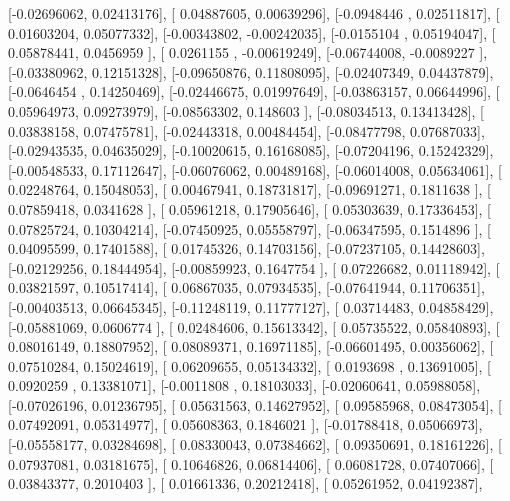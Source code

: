 \documentclass{article}
\begin{document}
       [-0.02696062,  0.02413176],
       [ 0.04887605,  0.00639296],
       [-0.0948446 ,  0.02511817],
       [ 0.01603204,  0.05077332],
       [-0.00343802, -0.00242035],
       [-0.0155104 ,  0.05194047],
       [ 0.05878441,  0.0456959 ],
       [ 0.0261155 , -0.00619249],
       [-0.06744008, -0.0089227 ],
       [-0.03380962,  0.12151328],
       [-0.09650876,  0.11808095],
       [-0.02407349,  0.04437879],
       [-0.0646454 ,  0.14250469],
       [-0.02446675,  0.01997649],
       [-0.03863157,  0.06644996],
       [ 0.05964973,  0.09273979],
       [-0.08563302,  0.148603  ],
       [-0.08034513,  0.13413428],
       [ 0.03838158,  0.07475781],
       [-0.02443318,  0.00484454],
       [-0.08477798,  0.07687033],
       [-0.02943535,  0.04635029],
       [-0.10020615,  0.16168085],
       [-0.07204196,  0.15242329],
       [-0.00548533,  0.17112647],
       [-0.06076062,  0.00489168],
       [-0.06014008,  0.05634061],
       [ 0.02248764,  0.15048053],
       [ 0.00467941,  0.18731817],
       [-0.09691271,  0.1811638 ],
       [ 0.07859418,  0.0341628 ],
       [ 0.05961218,  0.17905646],
       [ 0.05303639,  0.17336453],
       [ 0.07825724,  0.10304214],
       [-0.07450925,  0.05558797],
       [-0.06347595,  0.1514896 ],
       [ 0.04095599,  0.17401588],
       [ 0.01745326,  0.14703156],
       [-0.07237105,  0.14428603],
       [-0.02129256,  0.18444954],
       [-0.00859923,  0.1647754 ],
       [ 0.07226682,  0.01118942],
       [ 0.03821597,  0.10517414],
       [ 0.06867035,  0.07934535],
       [-0.07641944,  0.11706351],
       [-0.00403513,  0.06645345],
       [-0.11248119,  0.11777127],
       [ 0.03714483,  0.04858429],
       [-0.05881069,  0.0606774 ],
       [ 0.02484606,  0.15613342],
       [ 0.05735522,  0.05840893],
       [ 0.08016149,  0.18807952],
       [ 0.08089371,  0.16971185],
       [-0.06601495,  0.00356062],
       [ 0.07510284,  0.15024619],
       [ 0.06209655,  0.05134332],
       [ 0.0193698 ,  0.13691005],
       [ 0.0920259 ,  0.13381071],
       [-0.0011808 ,  0.18103033],
       [-0.02060641,  0.05988058],
       [-0.07026196,  0.01236795],
       [ 0.05631563,  0.14627952],
       [ 0.09585968,  0.08473054],
       [ 0.07492091,  0.05314977],
       [ 0.05608363,  0.1846021 ],
       [-0.01788418,  0.05066973],
       [-0.05558177,  0.03284698],
       [ 0.08330043,  0.07384662],
       [ 0.09350691,  0.18161226],
       [ 0.07937081,  0.03181675],
       [ 0.10646826,  0.06814406],
       [ 0.06081728,  0.07407066],
       [ 0.03843377,  0.2010403 ],
       [ 0.01661336,  0.20212418],
       [ 0.05261952,  0.04192387],
\end{document}
